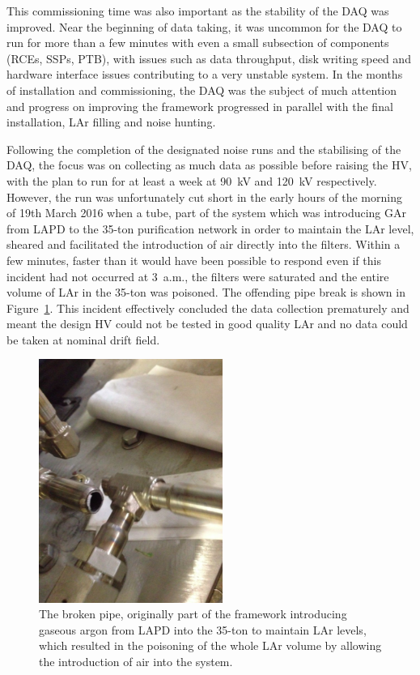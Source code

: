 This commissioning time was also important as the stability of the DAQ was improved.  Near the beginning of data taking, it was uncommon for the DAQ to run for more than a few minutes with even a small subsection of components (RCEs, SSPs, PTB), with issues such as data throughput, disk writing speed and hardware interface issues contributing to a very unstable system.  In the months of installation and commissioning, the DAQ was the subject of much attention and progress on improving the framework progressed in parallel with the final installation, LAr filling and noise hunting.

Following the completion of the designated noise runs and the stabilising of the DAQ, the focus was on collecting as much data as possible before raising the HV, with the plan to run for at least a week at 90~kV and 120~kV respectively.  However, the run was unfortunately cut short in the early hours of the morning of 19th March 2016 when a tube, part of the system which was introducing GAr from LAPD to the 35-ton purification network in order to maintain the LAr level, sheared and facilitated the introduction of air directly into the filters.  Within a few minutes, faster than it would have been possible to respond even if this incident had not occurred at 3~a.m., the filters were saturated and the entire volume of LAr in the 35-ton was poisoned.  The offending pipe break is shown in Figure~\ref{fig:35tonPipeBreak}.  This incident effectively concluded the data collection prematurely and meant the design HV could not be tested in good quality LAr and no data could be taken at nominal drift field.

\begin{figure}
  \centering
  \includegraphics[width=6cm]{35tonPipeBreak.png}
  \caption[The broken pipe, originally part of the framework introducing gaseous argon from LAPD into the 35-ton to maintain LAr levels, which resulted in the poisoning of the whole LAr volume by allowing the introduction of air into the system.]{The broken pipe, originally part of the framework introducing gaseous argon from LAPD into the 35-ton to maintain LAr levels, which resulted in the poisoning of the whole LAr volume by allowing the introduction of air into the system.}
  \label{fig:35tonPipeBreak}
\end{figure}

